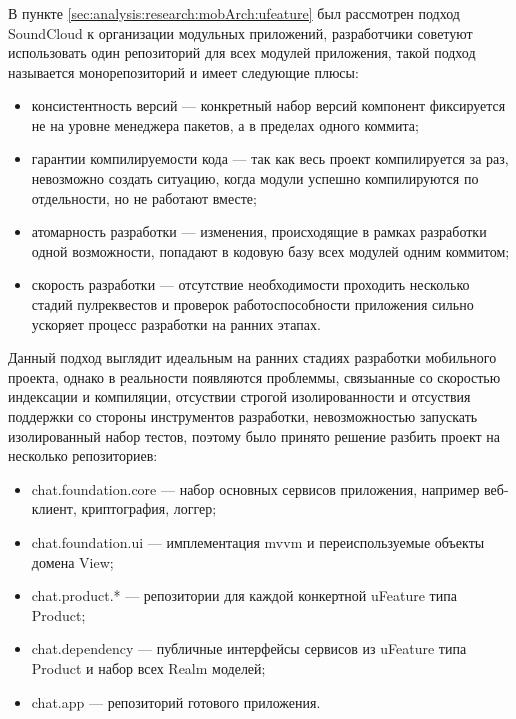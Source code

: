 \subsubsection{}
\label{sec:development:arch:ios:ufeature}

В пункте \ref{sec:analysis:research:mobArch:ufeature} был рассмотрен подход SoundCloud к организации модульных приложений, разработчики советуют использовать один репозиторий для всех модулей приложения, такой подход называется монорепозиторий и имеет следующие плюсы:

\begin{itemize}
\item консистентность версий --- конкретный набор версий компонент фиксируется не на уровне менеджера пакетов, а в пределах одного коммита;
\item гарантии компилируемости кода --- так как весь проект компилируется за раз, невозможно создать ситуацию, когда модули успешно компилируются по отдельности, но не работают вместе;
\item атомарность разработки --- изменения, происходящие в рамках разработки одной возможности, попадают в кодовую базу всех модулей одним коммитом;
\item скорость разработки --- отсутствие необходимости проходить несколько стадий пулреквестов и проверок работоспособности приложения сильно ускоряет процесс разработки на ранних этапах.
\end{itemize}

Данный подход выглядит идеальным на ранних стадиях разработки мобильного проекта, однако в реальности появляются проблеммы, связыанные со скоростью индексации и компиляции, отсуствии строгой изолированности и отсуствия поддержки со стороны инструментов разработки, невозможностью запускать изолированный набор тестов, поэтому было принято решение разбить проект на несколько репозиториев:

\begin{itemize}
\item chat.foundation.core --- набор основных сервисов приложения, например веб-клиент, криптография, логгер;
\item chat.foundation.ui --- имплементация \gls{mvvm} и переиспользуемые объекты домена View;
\item chat.product.* --- репозитории для каждой конкертной uFeature типа Product;
\item chat.dependency --- публичные интерфейсы сервисов из uFeature типа Product и набор всех Realm моделей;
\item chat.app --- репозиторий готового приложения.
\end{itemize}

